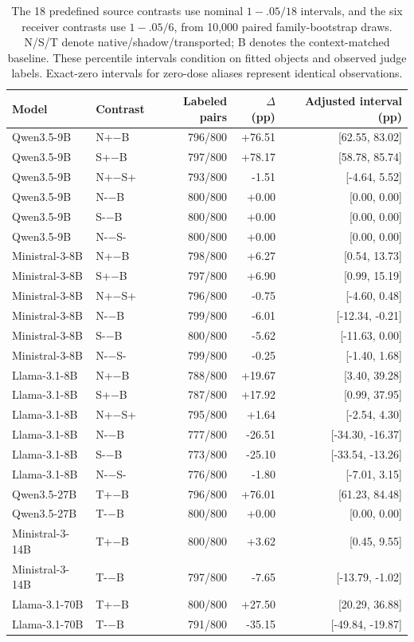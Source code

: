 \begin{table}[t]
\centering\scriptsize\setlength{\tabcolsep}{3pt}
\begin{tabular}{llrrr}
\toprule
Model & Contrast & Labeled pairs & $\Delta$ (pp) & Adjusted interval (pp) \\
\midrule
Qwen3.5-9B & N+$-$B & 796/800 & +76.51 & [62.55, 83.02] \\
Qwen3.5-9B & S+$-$B & 797/800 & +78.17 & [58.78, 85.74] \\
Qwen3.5-9B & N+$-$S+ & 793/800 & -1.51 & [-4.64, 5.52] \\
Qwen3.5-9B & N-$-$B & 800/800 & +0.00 & [0.00, 0.00] \\
Qwen3.5-9B & S-$-$B & 800/800 & +0.00 & [0.00, 0.00] \\
Qwen3.5-9B & N-$-$S- & 800/800 & +0.00 & [0.00, 0.00] \\
Ministral-3-8B & N+$-$B & 798/800 & +6.27 & [0.54, 13.73] \\
Ministral-3-8B & S+$-$B & 797/800 & +6.90 & [0.99, 15.19] \\
Ministral-3-8B & N+$-$S+ & 796/800 & -0.75 & [-4.60, 0.48] \\
Ministral-3-8B & N-$-$B & 799/800 & -6.01 & [-12.34, -0.21] \\
Ministral-3-8B & S-$-$B & 800/800 & -5.62 & [-11.63, 0.00] \\
Ministral-3-8B & N-$-$S- & 799/800 & -0.25 & [-1.40, 1.68] \\
Llama-3.1-8B & N+$-$B & 788/800 & +19.67 & [3.40, 39.28] \\
Llama-3.1-8B & S+$-$B & 787/800 & +17.92 & [0.99, 37.95] \\
Llama-3.1-8B & N+$-$S+ & 795/800 & +1.64 & [-2.54, 4.30] \\
Llama-3.1-8B & N-$-$B & 777/800 & -26.51 & [-34.30, -16.37] \\
Llama-3.1-8B & S-$-$B & 773/800 & -25.10 & [-33.54, -13.26] \\
Llama-3.1-8B & N-$-$S- & 776/800 & -1.80 & [-7.01, 3.15] \\
Qwen3.5-27B & T+$-$B & 796/800 & +76.01 & [61.23, 84.48] \\
Qwen3.5-27B & T-$-$B & 800/800 & +0.00 & [0.00, 0.00] \\
Ministral-3-14B & T+$-$B & 800/800 & +3.62 & [0.45, 9.55] \\
Ministral-3-14B & T-$-$B & 797/800 & -7.65 & [-13.79, -1.02] \\
Llama-3.1-70B & T+$-$B & 800/800 & +27.50 & [20.29, 36.88] \\
Llama-3.1-70B & T-$-$B & 791/800 & -35.15 & [-49.84, -19.87] \\
\bottomrule
\end{tabular}
\caption{The 18 predefined source contrasts use nominal $1-.05/18$ intervals, and the six receiver contrasts use $1-.05/6$, from 10,000 paired family-bootstrap draws. N/S/T denote native/shadow/transported; B denotes the context-matched baseline. These percentile intervals condition on fitted objects and observed judge labels. Exact-zero intervals for zero-dose aliases represent identical observations.}
\label{tab:current-adjusted}
\end{table}
